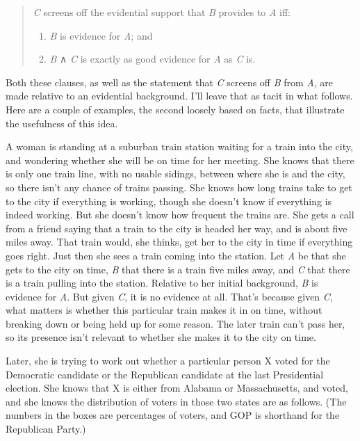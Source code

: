 \documentclass[
  10pt,
  letterpaper,
  twoside]{scrbook}
\providecommand{\tightlist}{%
  \setlength{\itemsep}{0pt}\setlength{\parskip}{0pt}}\usepackage{longtable,booktabs,array}
\begin{document}
\begin{quote}
\emph{C} screens off the evidential support that \emph{B} provides to
\emph{A} iff:

\begin{enumerate}
\def\labelenumi{\arabic{enumi}.}
\tightlist
\item
  \emph{B} is evidence for \emph{A}; and
\item
  \emph{B} ∧ \emph{C} is exactly as good evidence for \emph{A} as
  \emph{C} is.
\end{enumerate}
\end{quote}

Both these clauses, as well as the statement that \emph{C} screens off
\emph{B} from \emph{A}, are made relative to an evidential background.
I'll leave that as tacit in what follows. Here are a couple of examples,
the second loosely based on facts, that illustrate the usefulness of
this idea.

A woman is standing at a suburban train station waiting for a train into
the city, and wondering whether she will be on time for her meeting. She
knows that there is only one train line, with no usable sidings, between
where she is and the city, so there isn't any chance of trains passing.
She knows how long trains take to get to the city if everything is
working, though she doesn't know if everything is indeed working. But
she doesn't know how frequent the trains are. She gets a call from a
friend saying that a train to the city is headed her way, and is about
five miles away. That train would, she thinks, get her to the city in
time if everything goes right. Just then she sees a train coming into
the station. Let \emph{A} be that she gets to the city on time, \emph{B}
that there is a train five miles away, and \emph{C} that there is a
train pulling into the station. Relative to her initial background,
\emph{B} is evidence for \emph{A}. But given \emph{C}, it is no evidence
at all. That's because given \emph{C}, what matters is whether this
particular train makes it in on time, without breaking down or being
held up for some reason. The later train can't pass her, so its presence
isn't relevant to whether she makes it to the city on time.

Later, she is trying to work out whether a particular person X voted for
the Democratic candidate or the Republican candidate at the last
Presidential election. She knows that X is either from Alabama or
Massachusetts, and voted, and she knows the distribution of voters in
those two states are as follows. (The numbers in the boxes are
percentages of voters, and GOP is shorthand for the Republican Party.)
\end{document}
